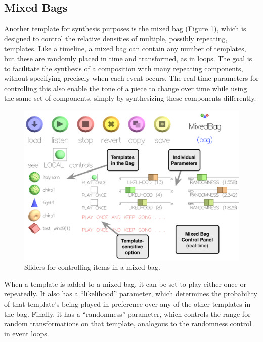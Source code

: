 \documentclass[10pt,letterpaper]{article}
\begin{document}
\subsection{Mixed Bags}

Another template for synthesis purposes is the mixed bag (Figure
\ref{fig:ui_mixedbag_params}), which is designed to control the relative
densities of multiple, possibly repeating, templates. Like a timeline, a
mixed bag can contain any number of templates, but these are randomly
placed in time and transformed, as in loops. The goal is to facilitate
the synthesis of a composition with many repeating components, without
specifying precisely when each event occurs. The real-time parameters
for controlling this also enable the tone of a piece to change over time
while using the same set of components, simply by synthesizing these
components differently. 

\begin{figure}[h]
  \begin{center}
    \includegraphics[width=1\columnwidth]{ui_mixedbag.pdf}
    \caption{Sliders for controlling items in a mixed bag.} 
    \label{fig:ui_mixedbag_params}
  \end{center}
\end{figure}

When a template is added to a mixed bag, it can be set to play either
once or repeatedly. It also has a ``likelihood'' parameter, which
determines the probability of that template's being played in preference
over any of the other templates in the bag. Finally, it has a
``randomness'' parameter, which controls the range for random
transformations on that template, analogous to the randomness control in
event loops.
\end{document}
